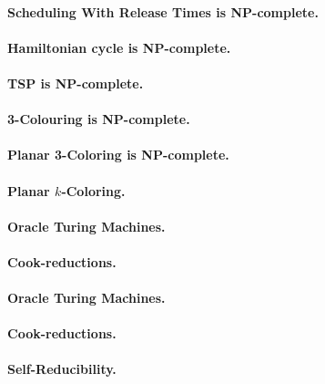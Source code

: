 \documentclass[11pt,a4paper]{article}
\theoremstyle{definition}
\begin{document}
\paragraph{Scheduling With Release Times is NP-complete.}

\paragraph{Hamiltonian cycle is NP-complete.}

\paragraph{TSP is NP-complete.}

\paragraph{3-Colouring is NP-complete.}

\paragraph{Planar 3-Coloring is NP-complete.}

\paragraph{Planar $k$-Coloring.}

\paragraph{Oracle Turing Machines.}

\paragraph{Cook-reductions.}

\paragraph{Oracle Turing Machines.}

\paragraph{Cook-reductions.}

\paragraph{Self-Reducibility.}
\end{document}
